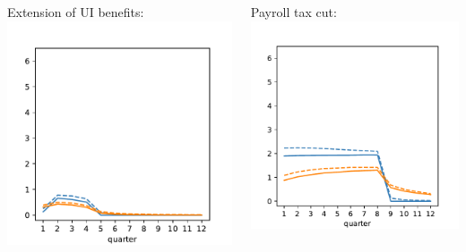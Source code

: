 \documentclass[pdflatex,aspectratio=169, handout]{beamer}
\begin{document}
{\begin{frame}
\begin{columns}
                \begin{column}{0.50\textwidth}  	
                  Extension of UI benefits:
                  \includegraphics[width=1.2\linewidth]{Code/HA-Models/FromPandemicCode/Figures/recession_UI_relrecession} 
                \end{column}
                
                \begin{column}{0.50\textwidth}  
                  Payroll tax cut:	
                  \includegraphics[width=1.2\linewidth]{Code/HA-Models/FromPandemicCode/Figures/recession_taxcut_relrecession}
                \end{column}
              \end{columns}
              

\end{frame}}
\end{document}

